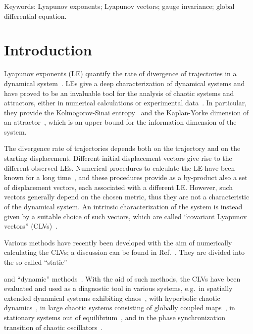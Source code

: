 \documentclass{article}
\theoremstyle{plain}
\theoremstyle{definition}
\theoremstyle{remark}
\providecommand{\detail}[1]{#1}
\renewcommand{\detail}[1]{}
\begin{document}
\vspace{0.5cm}

Keywords: Lyapunov exponents; Lyapunov vectors; gauge invariance;
global differential equation.


\vspace{0.5cm}

\section{Introduction}

Lyapunov exponents (LE) quantify the rate of divergence of
trajectories in a dynamical system~\cite{pikovsky}.  LEs give a deep
characterization of dynamical systems and have proved to be an
invaluable tool for the analysis of chaotic systems and attractors,
either in numerical calculations or experimental data~\cite{wolf1985}.
In particular, they provide the Kolmogorov-Sinai
entropy~\cite{pesin1977} and the Kaplan-Yorke dimension of an
attractor~\cite{frederickson1983}, which is an upper bound for the
information dimension of the system.

The divergence rate of trajectories depends both on the trajectory and
on the starting displacement. Different initial displacement vectors
give rise to the different observed LEs. 
Numerical procedures to calculate the LE have been known for a long
time~\cite{benettin1980, shimada1979}, and these procedures provide
as a by-product also a set of displacement
vectors, each associated with a different LE.
However, such vectors generally depend on
the chosen metric, thus they are not a characteristic of the
dynamical system. An intrinsic characterization of the system is
instead given by a suitable choice of such vectors, which are called
``covariant Lyapunov vectors'' (CLVs)~\cite{pikovsky, kuptsov2012}.

Various methods have recently been developed with the aim of
numerically calculating the CLVs; a discussion can be found in
Ref.~\cite{ginelli2013}.  \detail{``Static'' methods are summarized in
  section 6, the paper is mainly on the ``dynamic'' method.} They are
divided into the so-called ``static''~\cite{wolfe2007, kuptsov2012}
\detail{they require the calculation of the FOLVs and BOLVs}
\detail{Eq.~(41) of Kuptsov-Parlitz} and ``dynamic''
methods~\cite{ginelli2007}.  \detail{they aim at directly finding the
  CLVs} With the aid of such methods, the CLVs have been evaluated and
used as a diagnostic tool in various systems, e.g.\ in spatially
extended dynamical systems exhibiting chaos~\cite{szendro2007}, with
hyperbolic chaotic dynamics~\cite{kuptsov2009}, in large chaotic
systems consisting of globally coupled maps~\cite{takeuchi2009}, in
stationary systems out of equilibrium~\cite{bosetti2010}, and in the
phase synchronization transition of chaotic
oscillators~\cite{ouchi2011}.
\end{document}
